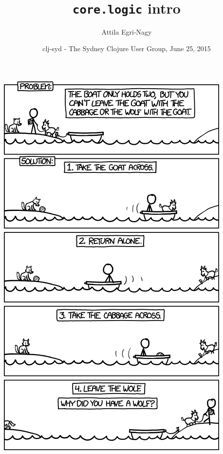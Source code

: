 \documentclass{beamer}
\begin{document}
\title[core.logic.intro]{\texttt{core.logic} intro}
\author[e-n@]{Attila Egri-Nagy}
\date[(nth clj-syd 31)]{clj-syd - The Sydney Clojure User Group, June 25, 2015}

\maketitle

\begin{frame}
\includegraphics[height=\textheight]{logic_boat.png}
\end{frame}
\end{document}
